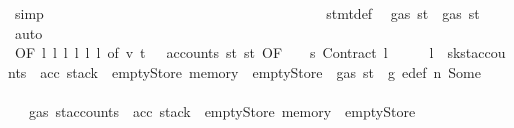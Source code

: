 \begin{isabellebody}
\ simp\isanewline
\ \ \ \ \ \ \ \ \ \ \ \ \ \ \ \ \ \ \ \ \ \ \ \ \ \ \ \ \ \ \ \ \ \ \ \ \ \ \isamarkupfalse%
\ stmt{\isacharunderscore}{\kern0pt}def\ \isamarkupfalse%
\ {\isachardoublequoteopen}gas\ st{}{\isacharprime}{\kern0pt}\ {\isasymle}\ gas\ st{\isacharprime}{\kern0pt}{\isacharprime}{\kern0pt}{\isacharprime}{\kern0pt}{\isacharprime}{\kern0pt}{\isachardoublequoteclose}\ \isamarkupfalse%
\ auto\isanewline
\ \ \ \ \ \ \ \ \ \ \ \ \ \ \ \ \ \ \ \ \ \ \ \ \ \ \ \ \ \ \ \ \ \ \ \ \ \ \isamarkupfalse%
\ \isamarkupfalse%
\ {}{\isacharparenleft}{\kern0pt}{}{\isacharparenright}{\kern0pt}{\isacharbrackleft}{\kern0pt}OF\ l{}\ l{}\ l{}\ l{}\ l{}\ l{}{\isacharcomma}{\kern0pt}\ of\ v\ t\ {\isacharunderscore}{\kern0pt}\ {\isacharunderscore}{\kern0pt}\ {\isachardoublequoteopen}accounts\ st{\isacharprime}{\kern0pt}{\isacharprime}{\kern0pt}{\isacharprime}{\kern0pt}{\isachardoublequoteclose}\ {\isachardoublequoteopen}st{\isacharprime}{\kern0pt}{\isacharprime}{\kern0pt}{\isacharprime}{\kern0pt}{\isachardoublequoteclose}{\isacharcomma}{\kern0pt}\ OF\ {\isacharunderscore}{\kern0pt}\ {\isacharunderscore}{\kern0pt}\ {\isacharunderscore}{\kern0pt}\ s{}\ Contract\ l{}\ {\isacharunderscore}{\kern0pt}\ {\isacharunderscore}{\kern0pt}\ {\isacharunderscore}{\kern0pt}\ {\isacharunderscore}{\kern0pt}\ {\isacharunderscore}{\kern0pt}\ l{}{\isacharcomma}{\kern0pt}\ \ {\isacharquery}{\kern0pt}s{\isacharprime}{\kern0pt}k{\isacharequal}{\kern0pt}{\isachardoublequoteopen}st{\isacharprime}{\kern0pt}{\isacharprime}{\kern0pt}{\isacharprime}{\kern0pt}{\isasymlparr}accounts\ {\isacharcolon}{\kern0pt}{\isacharequal}{\kern0pt}\ acc{\isacharcomma}{\kern0pt}\ stack\ {\isacharcolon}{\kern0pt}{\isacharequal}{\kern0pt}\ emptyStore{\isacharcomma}{\kern0pt}\ memory\ {\isacharcolon}{\kern0pt}{\isacharequal}{\kern0pt}\ emptyStore{\isasymrparr}{\isachardoublequoteclose}{\isacharbrackright}{\kern0pt}\ {\isacharbackquoteopen}{\isasymnot}\ gas\ st\ {\isasymle}\ g{\isacharbackquoteclose}\ e{\isacharprime}{\kern0pt}{\isacharunderscore}{\kern0pt}def\ n{}\ Some\isanewline
\ \ \ \ \ \ \ \ \ \ \ \ \ \ \ \ \ \ \ \ \ \ \ \ \ \ \ \ \ \ \ \ \ \ \ \ \ \ \ \ \isamarkupfalse%
\ {\isachardoublequoteopen}{\isasymdots}\ {\isasymle}\ gas\ {\isacharparenleft}{\kern0pt}st{\isacharprime}{\kern0pt}{\isacharprime}{\kern0pt}{\isacharprime}{\kern0pt}{\isasymlparr}accounts\ {\isacharcolon}{\kern0pt}{\isacharequal}{\kern0pt}\ acc{\isacharcomma}{\kern0pt}\ stack\ {\isacharcolon}{\kern0pt}{\isacharequal}{\kern0pt}\ emptyStore{\isacharcomma}{\kern0pt}\ memory\ {\isacharcolon}{\kern0pt}{\isacharequal}{\kern0pt}\ emptyStore{\isasymrparr}{\isacharparenright}{\kern0pt}{\isachardoublequoteclose}\ \isamarkupfalse%

\end{isabellebody}
